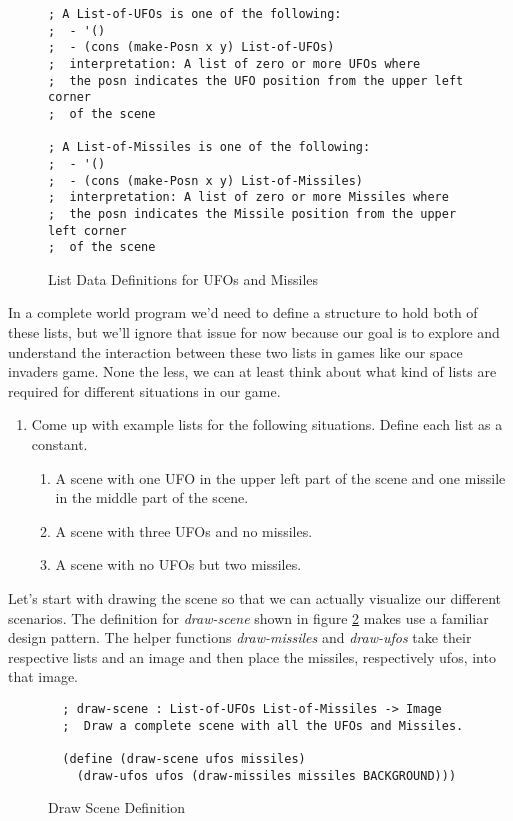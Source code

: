 \documentclass[nobib]{tufte-handout}
\begin{document}
\begin{figure}[ht]
\begin{lstlisting}
; A List-of-UFOs is one of the following:
;  - '()
;  - (cons (make-Posn x y) List-of-UFOs)
;  interpretation: A list of zero or more UFOs where
;  the posn indicates the UFO position from the upper left corner
;  of the scene

; A List-of-Missiles is one of the following:
;  - '()
;  - (cons (make-Posn x y) List-of-Missiles)
;  interpretation: A list of zero or more Missiles where
;  the posn indicates the Missile position from the upper left corner
;  of the scene
\end{lstlisting}
\caption{List Data Definitions for UFOs and Missiles}
\label{listDD}
\end{figure}

In a complete world program we'd need to define a structure to hold both of these lists, but we'll ignore that issue for now because our goal is to explore and understand the interaction between these two lists in games like our space invaders game. None the less, we can at least think about what kind of lists are required for different situations in our game.

\begin{enumerate}
  \item Come up with example lists for the following situations. Define each list as a constant.
  \begin{enumerate}
    \item A scene with one UFO in the upper left part of the scene and one missile in the middle part of the scene.
    \item A scene with three UFOs and no missiles.
    \item A scene with no UFOs but two missiles.
  \end{enumerate}
\end{enumerate}

Let's start with drawing the scene so that we can actually visualize our different scenarios. The definition for \textit{draw-scene} shown in figure \ref{draw} makes use a familiar design pattern. The helper functions \textit{draw-missiles} and \textit{draw-ufos} take their respective lists and an image and then place the missiles, respectively ufos, into that image.

\begin{figure}[ht]
  \begin{lstlisting}
  ; draw-scene : List-of-UFOs List-of-Missiles -> Image
  ;  Draw a complete scene with all the UFOs and Missiles.

  (define (draw-scene ufos missiles)
    (draw-ufos ufos (draw-missiles missiles BACKGROUND)))

  \end{lstlisting}
  \caption{Draw Scene Definition}
  \label{draw}
\end{figure}
\end{document}
